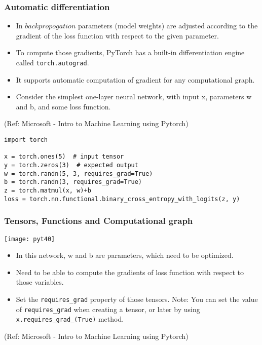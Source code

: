 \begin{frame}[fragile] \frametitle{Automatic differentiation}

\begin{itemize}
\item In $backpropogation$ parameters (model weights) are adjusted according to the gradient of the loss function with respect to the given parameter.
\item To compute those gradients, PyTorch has a built-in differentiation engine called \lstinline|torch.autograd|. 
\item It supports automatic computation of gradient for any computational graph.
\item Consider the simplest one-layer neural network, with input x, parameters w and b, and some loss function.
\end{itemize}

\tiny{(Ref: Microsoft - Intro to Machine Learning using Pytorch)}


\begin{lstlisting}
import torch

x = torch.ones(5)  # input tensor
y = torch.zeros(3)  # expected output
w = torch.randn(5, 3, requires_grad=True)
b = torch.randn(3, requires_grad=True)
z = torch.matmul(x, w)+b
loss = torch.nn.functional.binary_cross_entropy_with_logits(z, y)
\end{lstlisting}

\end{frame}

\begin{frame}[fragile] \frametitle{Tensors, Functions and Computational graph}

\begin{center}
\texttt{[image: pyt40]}
\end{center}

\begin{itemize}
\item In this network, w and b are parameters, which need to be optimized. 
\item Need to be able to compute the gradients of loss function with respect to those variables. 
\item Set the \lstinline|requires_grad| property of those tensors. Note: You can set the value of \lstinline|requires_grad| when creating a tensor, or later by using \lstinline|x.requires_grad_(True)| method.
\end{itemize}


\tiny{(Ref: Microsoft - Intro to Machine Learning using Pytorch)}
\end{frame}

